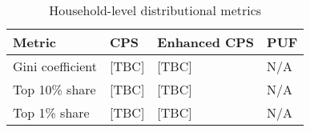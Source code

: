 \begin{table}[h]
    \centering
    \caption{Household-level distributional metrics}
    \label{tab:household_metrics}
    \begin{tabular}{llll}
    \toprule
    Metric & CPS & Enhanced CPS & PUF \\
    \midrule
    Gini coefficient & [TBC] & [TBC] & N/A \\
    Top 10\% share & [TBC] & [TBC] & N/A \\
    Top 1\% share & [TBC] & [TBC] & N/A \\
    \bottomrule
    \end{tabular}
\end{table}
